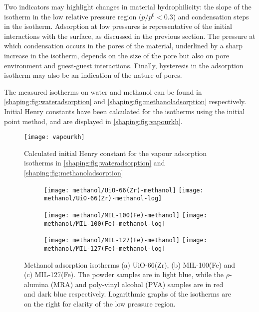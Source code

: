 Two indicators may highlight changes in material hydrophilicity: 
the slope of the isotherm in the low relative pressure region 
(\(p/p^0 < 0.3\)) and condensation steps in the isotherm. 
Adsorption at low pressures is representative of the initial
interactions with the surface, as discussed in the previous section.
The pressure at which condensation occurs in the pores of the material, 
underlined by a sharp increase in the isotherm, depends on the 
size of the pore but also on pore environment and 
guest-guest interactions. Finally, hysteresis in the adsorption 
isotherm may also be an indication of the nature of pores.

The measured isotherms on water and methanol can be found
in \autoref{shaping:fig:wateradsorption} 
and \autoref{shaping:fig:methanoladsorption} respectively.
Initial Henry constants have been calculated for the isotherms
using the initial point method, and are displayed in
\autoref{shaping:fig:vapourkh}.

\begin{figure}[htb]
    \centering
    \texttt{[image: vapourkh]}%
    \caption{Calculated initial Henry constant for
    the vapour adsorption isotherms 
    in \autoref{shaping:fig:wateradsorption}
    and \autoref{shaping:fig:methanoladsorption}}%
    \label{shaping:fig:vapourkh}
\end{figure}

\begin{figure}[p!]
    \centering

    \begin{subfigure}{\linewidth}
        \centering
        \texttt{[image: methanol/UiO-66(Zr)-methanol]}%
        \texttt{[image: methanol/UiO-66(Zr)-methanol-log]}%
        \caption{}\label{shaping:fig:methanoluio66}%
    \end{subfigure}%

    \begin{subfigure}{\linewidth}
        \centering
        \texttt{[image: methanol/MIL-100(Fe)-methanol]}%
        \texttt{[image: methanol/MIL-100(Fe)-methanol-log]}%
        \caption{}\label{shaping:fig:methanolmil100}%
    \end{subfigure}%

    \begin{subfigure}{\linewidth}
        \centering
        \texttt{[image: methanol/MIL-127(Fe)-methanol]}%
        \texttt{[image: methanol/MIL-127(Fe)-methanol-log]}%
        \caption{}\label{shaping:fig:methanolmil127}%
    \end{subfigure}%
    
    \caption{Methanol adsorption isotherms (a) UiO-66(Zr), 
    (b) MIL-100(Fe) and (c) MIL-127(Fe). The powder samples are in light
    blue, while the \(\rho\)-alumina (MRA) and poly-vinyl alcohol 
    (PVA) samples are in red and dark blue respectively. Logarithmic 
    graphs of the isotherms are on the right for clarity of the low
    pressure region.}%
    \label{shaping:fig:methanoladsorption}
\end{figure}

